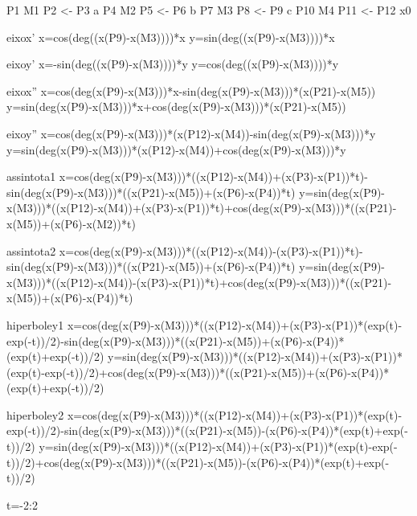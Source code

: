 P1  M1 P2    <-  P3  a
P4  M2 P5    <-  P6  b
P7  M3 P8    <-  P9  c
P10 M4 P11   <-  P12 x0


eixox'
x=cos(deg((x(P9)-x(M3))))*x
y=sin(deg((x(P9)-x(M3))))*x

eixoy'
x=-sin(deg((x(P9)-x(M3))))*y
y=cos(deg((x(P9)-x(M3))))*y


eixox''
x=cos(deg(x(P9)-x(M3)))*x-sin(deg(x(P9)-x(M3)))*(x(P21)-x(M5))
y=sin(deg(x(P9)-x(M3)))*x+cos(deg(x(P9)-x(M3)))*(x(P21)-x(M5))


eixoy''
x=cos(deg(x(P9)-x(M3)))*(x(P12)-x(M4))-sin(deg(x(P9)-x(M3)))*y
y=sin(deg(x(P9)-x(M3)))*(x(P12)-x(M4))+cos(deg(x(P9)-x(M3)))*y


assintota1
x=cos(deg(x(P9)-x(M3)))*((x(P12)-x(M4))+(x(P3)-x(P1))*t)-sin(deg(x(P9)-x(M3)))*((x(P21)-x(M5))+(x(P6)-x(P4))*t)
y=sin(deg(x(P9)-x(M3)))*((x(P12)-x(M4))+(x(P3)-x(P1))*t)+cos(deg(x(P9)-x(M3)))*((x(P21)-x(M5))+(x(P6)-x(M2))*t)


assintota2
x=cos(deg(x(P9)-x(M3)))*((x(P12)-x(M4))-(x(P3)-x(P1))*t)-sin(deg(x(P9)-x(M3)))*((x(P21)-x(M5))+(x(P6)-x(P4))*t)
y=sin(deg(x(P9)-x(M3)))*((x(P12)-x(M4))-(x(P3)-x(P1))*t)+cos(deg(x(P9)-x(M3)))*((x(P21)-x(M5))+(x(P6)-x(P4))*t)


hiperboley1
x=cos(deg(x(P9)-x(M3)))*((x(P12)-x(M4))+(x(P3)-x(P1))*(exp(t)-exp(-t))/2)-sin(deg(x(P9)-x(M3)))*((x(P21)-x(M5))+(x(P6)-x(P4))*(exp(t)+exp(-t))/2)
y=sin(deg(x(P9)-x(M3)))*((x(P12)-x(M4))+(x(P3)-x(P1))*(exp(t)-exp(-t))/2)+cos(deg(x(P9)-x(M3)))*((x(P21)-x(M5))+(x(P6)-x(P4))*(exp(t)+exp(-t))/2)

hiperboley2
x=cos(deg(x(P9)-x(M3)))*((x(P12)-x(M4))+(x(P3)-x(P1))*(exp(t)-exp(-t))/2)-sin(deg(x(P9)-x(M3)))*((x(P21)-x(M5))-(x(P6)-x(P4))*(exp(t)+exp(-t))/2)
y=sin(deg(x(P9)-x(M3)))*((x(P12)-x(M4))+(x(P3)-x(P1))*(exp(t)-exp(-t))/2)+cos(deg(x(P9)-x(M3)))*((x(P21)-x(M5))-(x(P6)-x(P4))*(exp(t)+exp(-t))/2)

t=-2:2